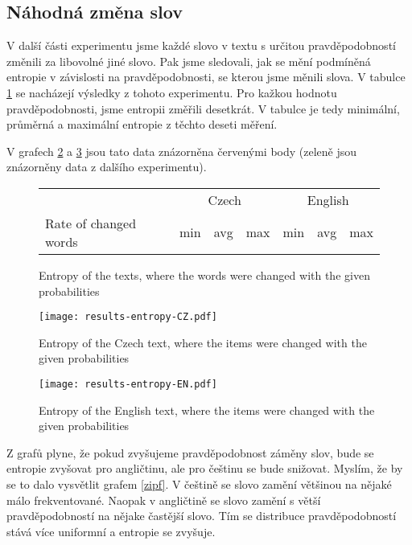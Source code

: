 \documentclass[11pt]{article}
\begin{document}
\subsection{Náhodná změna slov}

V další části experimentu jsme každé slovo v textu s určitou pravděpodobností změnili za libovolné jiné slovo. 
Pak jsme sledovali, jak se mění podmíněná entropie v závislosti na pravděpodobnosti, se kterou jsme měnili slova.
V tabulce \ref{results-entropy-words} se nacházejí výsledky z tohoto experimentu. Pro kažkou hodnotu pravděpodobnosti,
jsme entropii změřili desetkrát. V tabulce je tedy minimální, průměrná a maximální entropie z těchto deseti měření.

V grafech \ref{results-entropy-CZ} a \ref{results-entropy-EN} jsou tato data znázorněna červenými body (zeleně jsou 
znázorněny data z dalšího experimentu).

\begin{figure}
    \begin{center}
    \begin{tabular}{|l|ccc|ccc|}
        \hline
               & \multicolumn{3}{|c|}{Czech} & \multicolumn{3}{|c|}{English} \\
        Rate of changed words & min & avg & max & min & avg & max \\
        \hline
        
        \hline
    \end{tabular}
    \end{center}
    \caption{Entropy of the texts, where the words were changed with the given probabilities}
    \label{results-entropy-words}
\end{figure}


\begin{figure}
    \texttt{[image: results-entropy-CZ.pdf]}
    \caption{Entropy of the Czech text, where the items were changed with the given probabilities}
    \label{results-entropy-CZ}
\end{figure}

\begin{figure}
    \texttt{[image: results-entropy-EN.pdf]}
    \caption{Entropy of the English text, where the items were changed with the given probabilities}
    \label{results-entropy-EN}
\end{figure}

Z grafů plyne, že pokud zvyšujeme pravděpodobnost záměny slov, bude se entropie zvyšovat pro angličtinu,
ale pro češtinu se bude snižovat. Myslím, že by se to dalo vysvětlit grafem \ref{zipf}. V češtině se slovo zamění většinou
na nějaké málo frekventované. Naopak v angličtině se slovo zamění s větší pravděpodobností na nějake častější slovo. Tím 
se distribuce pravděpodobností stává více uniformní a entropie se zvyšuje.
\end{document}
